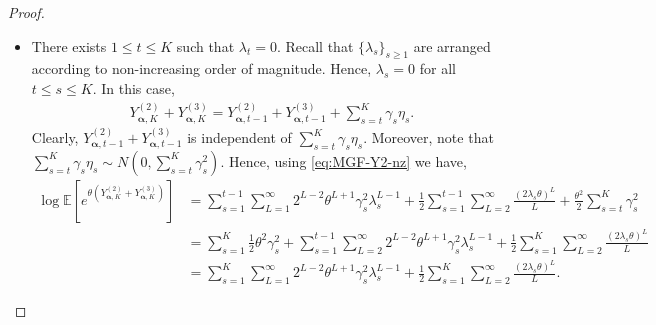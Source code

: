 \documentclass[11pt,reqno]{amsart}
\numberwithin{equation}{section}
\theoremstyle{definition}
\begin{document}
\begin{proof}
\begin{itemize}
\item[{\it Case} 2:] There exists $1\leq t \leq K$ such that $\lambda_{t} = 0$. Recall that $\{\lambda_{s}\}_{s \geq 1}$ are arranged according to non-increasing order of magnitude. Hence, $\lambda_{s} = 0$ for all $t \leq s \leq K$. 
In this case,
\begin{align*}
    Y_{\bm \alpha, K}^{(2)} + Y_{\bm \alpha, K}^{(3)} =  Y_{\bm \alpha, t-1}^{(2)} + Y_{\bm \alpha, t-1}^{(3)}  + \sum_{s=t}^{K} \gamma_{s} \eta_{s} . 
\end{align*} 
Clearly, $Y_{\bm \alpha, t-1}^{(2)} + Y_{\bm \alpha, t-1}^{(3)}$ is independent of 
$\sum_{s=t}^{K} \gamma_{s} \eta_{s}$. 
Moreover, note that $\sum_{s=t}^{K} \gamma_{s} \eta_{s} \sim N(0, \sum_{s=t}^{K} \gamma_s^2)$. Hence, using \eqref{eq:MGF-Y2-nz} we have,
\begin{align}\label{eq:MGF-Y2-z}
    \log\mathbb{E}\left[ e^{\theta (Y_{\bm \alpha, K}^{(2)} + Y_{\bm \alpha, K}^{(3)})} \right] 
    &= \sum_{s=1}^{t-1}\sum_{L=1}^{\infty}2^{L-2}\theta^{L+1}\gamma_{s}^{2}\lambda_{s}^{L-1}
    + \frac{1}{2}\sum_{s=1}^{t-1}\sum_{L=2}^{\infty}\frac{(2\lambda_{s} \theta)^{L}}{L} + \frac{\theta^{2}}{2} \sum_{s=t}^{K} \gamma_{s}^{2} \nonumber \\
    & = \sum_{s=1}^{K}\frac{1}{2} \theta^{2}\gamma_{s}^{2} + \sum_{s=1}^{t-1}\sum_{L=2}^{\infty}2^{L-2}\theta^{L+1}\gamma_{s}^{2}\lambda_{s}^{L-1}
    + \frac{1}{2}\sum_{s=1}^{K}\sum_{L=2}^{\infty}\frac{(2\lambda_{s} \theta)^{L}}{L}\nonumber \\
    & = \sum_{s=1}^{K}\sum_{L=1}^{\infty}2^{L-2}\theta^{L+1}\gamma_{s}^{2}\lambda_{s}^{L-1}
    + \frac{1}{2}\sum_{s=1}^{K}\sum_{L=2}^{\infty}\frac{(2\lambda_{s} \theta)^{L}}{L} . 
\end{align}

\end{itemize}


\end{proof}
\end{document}
